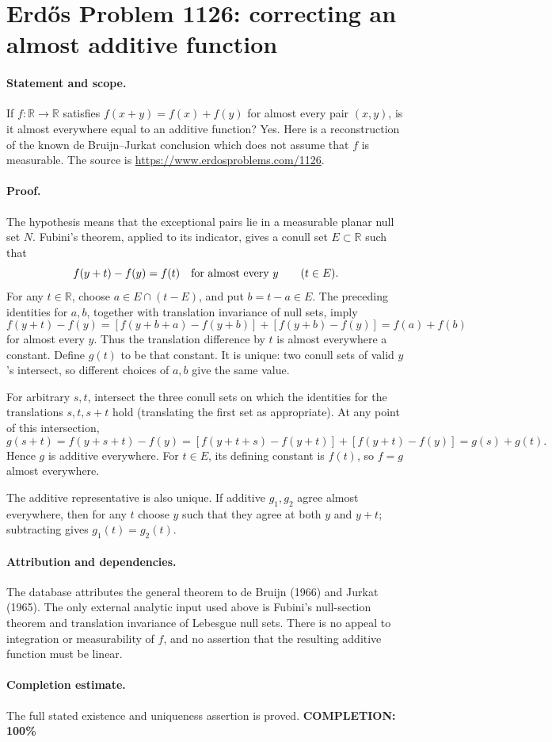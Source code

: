 \section*{Erd\H{o}s Problem 1126: correcting an almost additive function}

\paragraph{Statement and scope.}
If \(f:\mathbb R\to\mathbb R\) satisfies \(f(x+y)=f(x)+f(y)\) for almost every pair \((x,y)\), is it almost everywhere equal to an additive function?
Yes. Here is a reconstruction of the known de Bruijn--Jurkat conclusion which does not assume that \(f\) is measurable. The source is \url{https://www.erdosproblems.com/1126}.

\paragraph{Proof.}
The hypothesis means that the exceptional pairs lie in a measurable planar null set \(N\). Fubini's theorem, applied to its indicator, gives a conull set \(E\subset\mathbb R\) such that
\[
 f(y+t)-f(y)=f(t)\quad\hbox{for almost every }y
 \qquad(t\in E).
\]
For any \(t\in\mathbb R\), choose \(a\in E\cap(t-E)\), and put \(b=t-a\in E\).
The preceding identities for \(a,b\), together with translation invariance of null sets, imply
\[
 f(y+t)-f(y)
 =[f(y+b+a)-f(y+b)]+[f(y+b)-f(y)]
 =f(a)+f(b)
\]
for almost every \(y\). Thus the translation difference by \(t\) is almost everywhere a constant. Define \(g(t)\) to be that constant. It is unique: two conull sets of valid \(y\)'s intersect, so different choices of \(a,b\) give the same value.

For arbitrary \(s,t\), intersect the three conull sets on which the identities for the translations \(s,t,s+t\) hold (translating the first set as appropriate). At any point of this intersection,
\[
 g(s+t)=f(y+s+t)-f(y)
 =[f(y+t+s)-f(y+t)]+[f(y+t)-f(y)]
 =g(s)+g(t).
\]
Hence \(g\) is additive everywhere. For \(t\in E\), its defining constant is \(f(t)\), so \(f=g\) almost everywhere.

The additive representative is also unique. If additive \(g_1,g_2\) agree almost everywhere, then for any \(t\) choose \(y\) such that they agree at both \(y\) and \(y+t\); subtracting gives \(g_1(t)=g_2(t)\).

\paragraph{Attribution and dependencies.}
The database attributes the general theorem to de Bruijn (1966) and Jurkat (1965). The only external analytic input used above is Fubini's null-section theorem and translation invariance of Lebesgue null sets. There is no appeal to integration or measurability of \(f\), and no assertion that the resulting additive function must be linear.

\paragraph{Completion estimate.}
The full stated existence and uniqueness assertion is proved.
\textbf{COMPLETION: 100\%}
